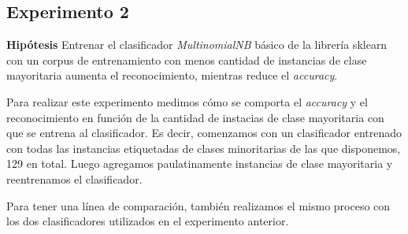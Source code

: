 \subsection{Experimento 2}
\vspace{3 mm}
\textbf{Hipótesis} Entrenar el clasificador \textit{MultinomialNB} básico de la librería sklearn con un corpus de entrenamiento con menos cantidad de instancias de clase mayoritaria aumenta el reconocimiento, mientras reduce el \textit{accuracy}.
\vspace{3 mm}

Para realizar este experimento medimos cómo se comporta el \textit{accuracy} y el reconocimiento en función de la cantidad de instacias de clase mayoritaria con que se entrena al clasificador. Es decir, comenzamos con un clasificador entrenado con todas las instancias etiquetadas de clases minoritarias de las que disponemos, 129 en total. Luego agregamos paulatinamente instancias de clase mayoritaria y reentrenamos el clasificador.

Para tener una línea de comparación, también realizamos el mismo proceso con los dos clasificadores utilizados en el experimento anterior.

